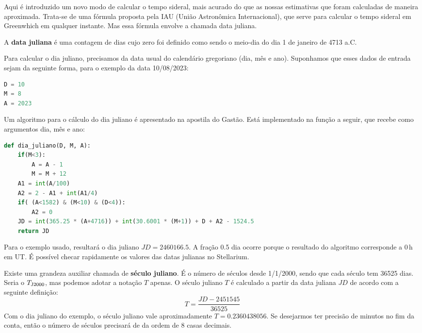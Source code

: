 Aqui é introduzido um novo modo de calcular o tempo sideral, mais acurado do que as nossas estimativas que foram calculadas de maneira aproximada. Trata-se de uma fórmula proposta pela IAU (União Astronômica Internacional), que serve para calcular o tempo sideral em Greenwhich em qualquer instante. Mas essa fórmula envolve a chamada data juliana. 

A \textbf{data juliana} é uma contagem de dias cujo zero foi definido como sendo o meio-dia do dia 1 de janeiro de 4713 a.C. 

Para calcular o dia juliano, precisamos da data usual do calendário gregoriano (dia, mês e ano). Suponhamos que esses dados de entrada sejam da seguinte forma, para o exemplo da data 10/08/2023:

\begin{lstlisting}[language=Python]
D = 10
M = 8
A = 2023
\end{lstlisting}

\noindent Um algoritmo para o cálculo do dia juliano é apresentado na apostila do Gastão. Está implementado na função a seguir, que recebe como argumentos dia, mês e ano:

\begin{lstlisting}[language=Python]
def dia_juliano(D, M, A):
    if(M<3):
        A = A - 1
        M = M + 12
    A1 = int(A/100)
    A2 = 2 - A1 + int(A1/4)        
    if( (A<1582) & (M<10) & (D<4)):
        A2 = 0
    JD = int(365.25 * (A+4716)) + int(30.6001 * (M+1)) + D + A2 - 1524.5
    return JD
\end{lstlisting}

\noindent Para o exemplo usado, resultará o dia juliano $JD = 2460166.5$. A fração 0.5 dia ocorre porque o resultado do algoritmo corresponde a 0\,h em UT. É possível checar rapidamente os valores das datas julianas no Stellarium.

Existe uma grandeza auxiliar chamada de \textbf{século juliano}. É o número de séculos desde 1/1/2000, sendo que cada século tem 36525 dias. Seria o $T_{\rm J2000}$, mas podemos adotar a notação $T$ apenas. O século juliano $T$ é calculado a partir da data juliana $JD$ de acordo com a seguinte definição:
%
\begin{equation}
T = \frac{JD - 2451545}{36525}
\end{equation}
%
Com o dia juliano do exemplo, o século juliano vale aproximadamente $T = 0.2360438056$. Se desejarmos ter precisão de minutos no fim da conta, então o número de séculos precisará de da ordem de 8 casas decimais.

